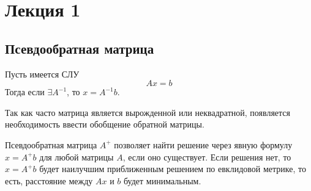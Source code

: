 \newpage
\section{Лекция 1}
\subsection{Псевдообратная матрица}
Пусть имеется СЛУ
$$Ax=b$$
Тогда если $\exists A^{-1}$, то $x=A^{-1}b$.

Так как часто матрица является вырожденной или неквадратной, появляется необходимость ввести обобщение обратной матрицы.

Псевдообратная матрица $A^+$ позволяет найти решение через явную формулу $x=A^+b$ для любой матрицы $A$, если оно существует.
Если решения нет, то $x=A^+b$ будет наилучшим приближенным решением по евклидовой метрике, то есть, расстояние между $Ax$ и $b$ будет минимальным.\bigskip

